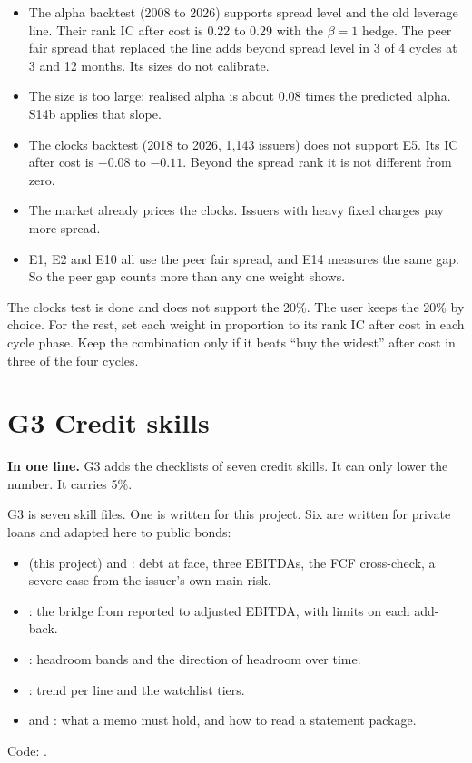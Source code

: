 \begin{itemize}
\item The alpha backtest (2008 to 2026) supports spread level and the old leverage line. Their rank IC after cost is 0.22 to 0.29 with the $\beta = 1$ hedge. The peer fair spread that replaced the line adds beyond spread level in 3 of 4 cycles at 3 and 12 months. Its sizes do not calibrate.
\item The size is too large: realised alpha is about 0.08 times the predicted alpha. S14b applies that slope.
\item The clocks backtest (2018 to 2026, 1,143 issuers) does not support E5. Its IC after cost is $-0.08$ to $-0.11$. Beyond the spread rank it is not different from zero.
\item The market already prices the clocks. Issuers with heavy fixed charges pay more spread.
\item E1, E2 and E10 all use the peer fair spread, and E14 measures the same gap. So the peer gap counts more than any one weight shows.
\end{itemize}

The clocks test is done and does not support the 20\%. The user keeps the 20\% by choice. For the rest, set each weight in proportion to its rank IC after cost in each cycle phase. Keep the combination only if it beats ``buy the widest'' after cost in three of the four cycles.

\newpage
\section*{\textcolor{gC}{G3} Credit skills}

\begin{notebox}
\textbf{In one line.} G3 adds the checklists of seven credit skills. It can only lower the number. It carries 5\%.
\end{notebox}

G3 is seven skill files. One is written for this project. Six are written for private loans and adapted here to public bonds:
\begin{itemize}
\item {} (this project) and : debt at face, three EBITDAs, the FCF cross-check, a severe case from the issuer's own main risk.
\item {}: the bridge from reported to adjusted EBITDA, with limits on each add-back.
\item {}: headroom bands and the direction of headroom over time.
\item {}: trend per line and the watchlist tiers.
\item {} and : what a memo must hold, and how to read a statement package.
\end{itemize}
Code: .

